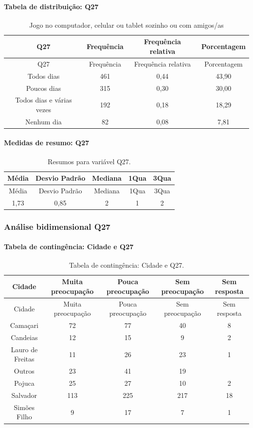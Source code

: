 \documentclass[]{article}
\let\oldparagraph\paragraph
\renewcommand{\paragraph}[1]{\oldparagraph{#1}\mbox{}}
\begin{document}
\hypertarget{tabela-de-distribuiuxe7uxe3o-q27}{%
\paragraph{Tabela de distribuição: Q27}\label{tabela-de-distribuiuxe7uxe3o-q27}}

\begin{longtable}[]{@{}cccc@{}}
\caption{\label{tab:unnamed-chunk-778}Jogo no computador, celular ou tablet sozinho ou com amigos/as}\tabularnewline
\toprule
Q27 & Frequência & Frequência relativa & Porcentagem\tabularnewline
\midrule
\endfirsthead
\toprule
Q27 & Frequência & Frequência relativa & Porcentagem\tabularnewline
\midrule
\endhead
Todos dias & 461 & 0,44 & 43,90\tabularnewline
Poucos dias & 315 & 0,30 & 30,00\tabularnewline
Todos dias e várias vezes & 192 & 0,18 & 18,29\tabularnewline
Nenhum dia & 82 & 0,08 & 7,81\tabularnewline
\bottomrule
\end{longtable}

\hypertarget{medidas-de-resumo-q27}{%
\paragraph{Medidas de resumo: Q27}\label{medidas-de-resumo-q27}}

\begin{longtable}[]{@{}ccccc@{}}
\caption{\label{tab:unnamed-chunk-779}Resumos para variável Q27.}\tabularnewline
\toprule
Média & Desvio Padrão & Mediana & 1Qua & 3Qua\tabularnewline
\midrule
\endfirsthead
\toprule
Média & Desvio Padrão & Mediana & 1Qua & 3Qua\tabularnewline
\midrule
\endhead
1,73 & 0,85 & 2 & 1 & 2\tabularnewline
\bottomrule
\end{longtable}

\cleardoublepage

\hypertarget{anuxe1lise-bidimensional-q27}{%
\subsubsection{Análise bidimensional Q27}\label{anuxe1lise-bidimensional-q27}}

\hypertarget{tabela-de-continguxeancia-cidade-e-q27}{%
\paragraph{Tabela de contingência: Cidade e Q27}\label{tabela-de-continguxeancia-cidade-e-q27}}

\begin{longtable}[]{@{}ccccc@{}}
\caption{\label{tab:unnamed-chunk-780}Tabela de contingência: Cidade e Q27.}\tabularnewline
\toprule
Cidade & Muita preocupação & Pouca preocupação & Sem preocupação & Sem resposta\tabularnewline
\midrule
\endfirsthead
\toprule
Cidade & Muita preocupação & Pouca preocupação & Sem preocupação & Sem resposta\tabularnewline
\midrule
\endhead
Camaçari & 72 & 77 & 40 & 8\tabularnewline
Candeias & 12 & 15 & 9 & 2\tabularnewline
Lauro de Freitas & 11 & 26 & 23 & 1\tabularnewline
Outros & 23 & 41 & 19 &\tabularnewline
Pojuca & 25 & 27 & 10 & 2\tabularnewline
Salvador & 113 & 225 & 217 & 18\tabularnewline
Simões Filho & 9 & 17 & 7 & 1\tabularnewline
\bottomrule
\end{longtable}
\end{document}
